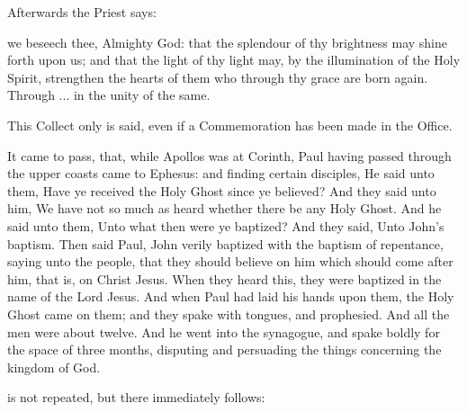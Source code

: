 \begin{rubric}
	Afterwards the Priest says:
\end{rubric}


\collect
{} we beseech thee, Almighty God: that the splendour of thy brightness may shine forth upon us; and that the light of thy light may, by the illumination of the Holy Spirit, strengthen the hearts of them who through thy grace are born again. Through ... in the unity of the same.

\begin{rubric}
	This Collect only is said, even if a Commemoration has been made in the Office.
\end{rubric}

 It came to pass, that, while Apollos was at Corinth, Paul having passed through the upper coasts came to Ephesus: and finding certain disciples, He said unto them, Have ye received the Holy Ghost since ye believed? And they said unto him, We have not so much as heard whether there be any Holy Ghost. And he said unto them, Unto what then were ye baptized? And they said, Unto John's baptism. Then said Paul, John verily baptized with the baptism of repentance, saying unto the people, that they should believe on him which should come after him, that is, on Christ Jesus. When they heard this, they were baptized in the name of the Lord Jesus. And when Paul had laid his hands upon them, the Holy Ghost came on them; and they spake with tongues, and prophesied. And all the men were about twelve. And he went into the synagogue, and spake boldly for the space of three months, disputing and persuading the things concerning the kingdom of God.


\clearpage
\begin{rubric}
	 is not repeated, but there immediately follows:
\end{rubric}


